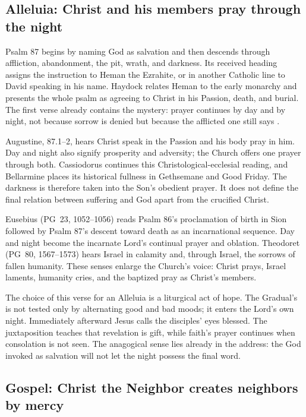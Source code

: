 \elementguard
\subsection*{Alleluia: Christ and his members pray through the night }

Psalm 87 begins by naming God as salvation and then descends through affliction,
abandonment, the pit, wrath, and darkness. Its received heading assigns the
instruction to Heman the Ezrahite, or in another Catholic line to David
speaking in his name. Haydock relates Heman to the early monarchy and presents
the whole psalm as agreeing to Christ in his Passion, death, and burial. The
first verse already contains the mystery: prayer continues by day and by
night, not because sorrow is denied but because the afflicted one still says
.

Augustine,  87.1--2, hears Christ speak in the
Passion and his body pray in him. Day and night also signify prosperity and
adversity; the Church offers one prayer through both. Cassiodorus continues
this Christological-ecclesial reading, and Bellarmine places its historical
fullness in Gethsemane and Good Friday. The darkness is therefore taken into
the Son's obedient prayer. It does not define the final relation
between suffering and God apart from the crucified Christ.

Eusebius (PG~23, 1052--1056) reads Psalm 86's proclamation of birth in Sion
followed by Psalm 87's descent toward death as an incarnational sequence. Day
and night become the incarnate Lord's continual prayer and oblation. Theodoret
(PG~80, 1567--1573) hears Israel in calamity and, through Israel, the sorrows
of fallen humanity. These senses enlarge the Church's voice: Christ prays,
Israel laments, humanity cries, and the baptized pray as Christ's members.

The choice of this verse for an Alleluia is a liturgical act of hope. The
Gradual's  is not tested only by alternating good and
bad moods; it enters the Lord's own night. Immediately afterward Jesus calls
the disciples' eyes blessed. The juxtaposition teaches that revelation is
gift, while faith's prayer continues when consolation is not seen. The
anagogical sense lies already in the address: the God invoked as salvation
will not let the night possess the final word.

\elementguard
\subsection*{Gospel: Christ the Neighbor creates neighbors by mercy }

